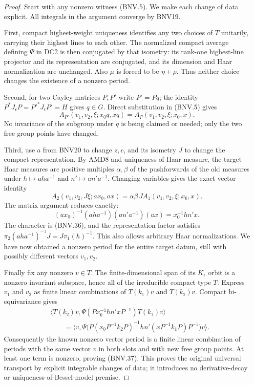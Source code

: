\begin{proof}
Start with any nonzero witness (BNV.5).  We make each change of data
explicit.  All integrals in the argument converge by BNV19.

First, compact highest-weight uniqueness identifies any two choices
of $T$ unitarily, carrying their highest lines to each other.  The
normalized compact average defining $\Psi$ in DC2 is then conjugated
by that isometry: its rank-one highest-line projector and its
representation are conjugated, and its dimension and Haar normalization
are unchanged.  Also $\mu$ is forced to be $\eta+\rho$.  Thus neither
choice changes the existence of a nonzero period.

Second, for two Cayley matrices $P,P'$ write $P'=Pq$; the identity
$P^*J_\epsilon P=P'^*J_\epsilon P'=H$ gives $q\in G$.
Direct substitution in (BNV.5) gives
\[
 A_{P'}(v_1,v_2,\xi;x_0q,xq)
           =A_P(v_1,v_2,\xi;x_0,x).
 \tag{BNV.38}
\]
No invariance of the subgroup under $q$ is being claimed or needed;
only the two free group points have changed.

Third, use $a$ from BNV20 to change $z,c$, and its isometry $J$ to
change the compact representation.  By AMD8 and uniqueness of Haar
measure, the target Haar measures are positive multiples
$\alpha,\beta$ of the pushforwards of the old measures under
$h\mapsto aha^{-1}$ and $n'\mapsto an'a^{-1}$.
Changing variables gives the exact vector identity
\[
 A_2(v_1,v_2,J\xi;ax_0,ax)
       =\alpha\beta\,J A_1(v_1,v_2,\xi;x_0,x).
 \tag{BNV.39}
\]
The matrix argument reduces exactly:
\[
 (ax_0)^{-1}(aha^{-1})(an'a^{-1})(ax)=x_0^{-1}hn'x.
\]
The character is (BNV.36), and the representation factor satisfies
$\pi_2(aha^{-1})^{-1}J=J\pi_1(h)^{-1}$.
This also allows arbitrary Haar normalizations.  We have now obtained
a nonzero period for the entire target datum, still with possibly
different vectors $v_1,v_2$.

Finally fix any nonzero $v\in T$.  The finite-dimensional span of its
$K_\epsilon$ orbit is a nonzero invariant subspace, hence all of the
irreducible compact type $T$.  Express $v_1$ and $v_2$ as finite linear
combinations of $T(k_1)v$ and $T(k_2)v$.  Compact bi-equivariance gives
\[
 \begin{split}
 &\langle T(k_2)v,\Psi(Px_0^{-1}hn'xP^{-1})T(k_1)v\rangle\\
 &\qquad=\langle v,
 \Psi\bigl(P(x_0P^{-1}k_2P)^{-1}hn'(xP^{-1}k_1P)P^{-1}\bigr)v\rangle.
 \end{split}
\]
Consequently the known nonzero vector period is a finite linear
combination of periods with the same vector $v$ in both slots and
with new free group points.  At least one term is nonzero, proving
(BNV.37).  This proves the original universal transport by explicit
integrable changes of data; it introduces no derivative-decay or
uniqueness-of-Bessel-model premise.
\end{proof}

